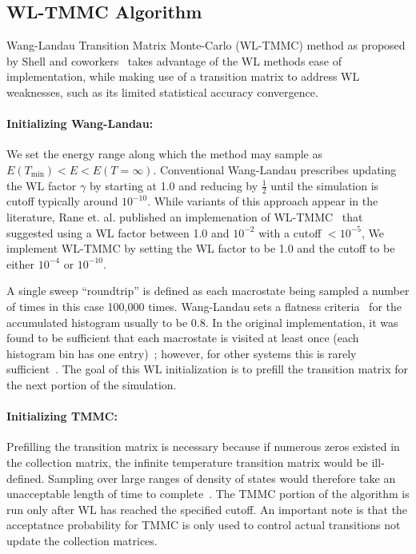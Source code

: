 \documentclass[letterpaper,twocolumn,amsmath,amssymb,pre,aps,10pt]{revtex4-1}
\begin{document}
\subsection{WL-TMMC Algorithm}
Wang-Landau Transition Matrix Monte-Carlo (WL-TMMC) method as proposed
by Shell and coworkers~\cite{shell2003improved,shell2004flat} takes
advantage of the WL methods ease of implementation, while making use of
a transition matrix to address WL weaknesses, such as its limited
statistical accuracy convergence.

\paragraph{Initializing Wang-Landau:}
We set the energy range along which the method may sample as
$E(T_{\min}) <E< E(T=\infty)$. Conventional Wang-Landau prescribes
updating the WL factor $\gamma$ by starting at 1.0 and reducing by
$\frac12$ until the simulation is cutoff typically around $10^{-10}$.
While variants of this approach appear in the literature, Rane et. al.
published an implemenation of WL-TMMC~\cite{rane2013monte} that
suggested using a WL factor between 1.0 and $10^{-2}$ with a cutoff
$<10^{-5}$, We implement WL-TMMC by setting the WL factor to be 1.0 and
the cutoff to be either $10^{-4}$ or $10^{-10}$.

A single sweep ``roundtrip'' is defined as each macrostate being
sampled a number of times in this case 100,000 times. Wang-Landau sets
a flatness criteria~\cite{wang2001determining, wang2001efficient,
hatch2015computational, mahynski2017predicting} for the accumulated
histogram usually to be 0.8.  In the original implementation, it was
found to be sufficient that each macrostate is visited at least once
(each histogram bin has one entry)~\cite{shell2003improved}; however,
for other systems this is rarely sufficient~\cite{bhar2009computer}.
The goal of this WL initialization is to prefill the transition matrix
for the next portion of the simulation.

\paragraph{Initializing TMMC:} Prefilling the transition matrix is
necessary because if numerous zeros existed in the collection matrix,
the infinite temperature transition matrix would be ill-defined.
Sampling over large ranges of density of states would therefore take an
unacceptable length of time to complete~\cite{shell2003improved,
shen2014elucidating}.  The TMMC portion of the algorithm is run only
after WL has reached the specified cutoff. An important note is that
the acceptatnce probability for TMMC is only used to control actual
transitions not update the collection matrices.
\end{document}

